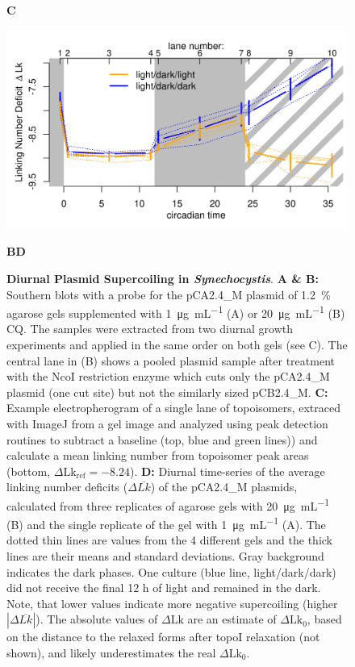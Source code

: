 \documentclass[10pt,a4]{article}
\newcommand{\ugml}{\micro\gram\per\milli\liter}
\newcommand{\scyst}{\textit{Synechocystis}}
\newcommand{\dlk}{\ensuremath{\Delta\text{Lk}}}
\newcommand{\dlkr}{\ensuremath{\Delta\text{Lk}_0}}
\begin{document}
\begin{figure}[ht!]
\begin{minipage}{.39\textwidth}
    \vspace{-.5cm}
    \textbf{C}
    
    \includegraphics[width=\textwidth]{figures/diurnal/linkingNumbers.png}
  \end{minipage}
  
  \vspace{-.5cm}
  \textbf{B}\hspace{.48\textwidth}\textbf{D}
  \vspace{.2cm}
  
  \caption{\textbf{Diurnal Plasmid Supercoiling in
      \scyst{}}. \textbf{A \& B:} Southern blots with a probe for the
    pCA2.4\_M plasmid of \SI{1.2}{\percent} agarose gels supplemented
    with \SI{1}{\ugml} (A) or \SI{20}{\ugml} (B) CQ. The samples were
    extracted from two diurnal growth experiments and applied in the
    same order on both gels (see C). The central lane in (B) shows a
    pooled plasmid sample after treatment with the NcoI restriction
    enzyme which cuts only the pCA2.4\_M plasmid (one cut site) but
    not the similarly sized pCB2.4\_M. \textbf{C:} Example
    electropherogram of a single lane of topoisomers, extraced with
    ImageJ from a gel image and analyzed using peak detection routines
    to subtract a baseline (top, blue and green lines)) and calculate
    a mean linking number from topoisomer peak areas (bottom,
    $\dlk_\text{ref}=-8.24$).  \textbf{D:} Diurnal time-series of the
    average linking number deficits ($\Delta \overline{Lk}$) of the
    pCA2.4\_M plasmids, calculated from three replicates of agarose
    gels with \SI{20}{\ugml} (B) and the single replicate of the gel
    with \SI{1}{\ugml} (A).  The dotted thin lines are values from the
    4 different gels and the thick lines are their means and standard
    deviations.  Gray background indicates the dark phases. One
    culture (blue line, light/dark/dark) did not receive the final 12
    h of light and remained in the dark.  Note, that lower values
    indicate more negative supercoiling (higher $|\Delta
    \overline{Lk}|$). The absolute values of $\dlk$ are an estimate of
    $\dlkr$, based on the distance to the relaxed forms after topoI
    relaxation (not shown), and likely underestimates the real
    $\dlkr$.}
    \label{fig:blot} 
\end{figure}
\end{document}
